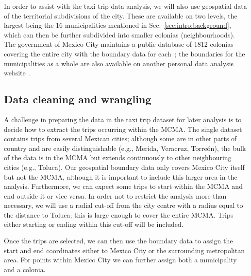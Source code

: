\documentclass[10pt, a4paper, onecolumn]{article}
\begin{document}
In order to assist with the taxi trip data analysis, we will also use geospatial data of the territorial subdivisions of the city. These are available on two levels, the largest being the 16 municipalities mentioned in Sec.~\ref{sec:intro:background}, which can then be further subdivided into smaller colonias (neighbourhoods). The government of Mexico City maintains a public database of 1812 colonias covering the entire city with the boundary data for each~\cite{colonias}; the boundaries for the municipalities as a whole are also available on another personal data analysis website~\cite{municipalities}.

\subsection{Data cleaning and wrangling}

A challenge in preparing the data in the taxi trip dataset for later analysis is to decide how to extract the trips occurring within the MCMA. The single dataset contains trips from several Mexican cities; although some are in other parts of country and are easily distinguishable (e.g., Merida, Veracruz, Torre{\'o}n), the bulk of the data is in the MCMA but extends continuously to other neighbouring cities (e.g., Toluca). Our geospatial boundary data only covers Mexico City itself but not the MCMA, although it is important to include this larger area in the analysis. Furthermore, we can expect some trips to start within the MCMA and end outside it or vice versa. In order not to restrict the analysis more than necessary, we will use a radial cut-off from the city centre with a radius equal to the distance to Toluca; this is large enough to cover the entire MCMA. Trips either starting or ending within this cut-off will be included.

Once the trips are selected, we can then use the boundary data to assign the start and end coordinates either to Mexico City or the surrounding metropolitan area. For points within Mexico City we can further assign both a municipality and a colonia.



\end{document}
